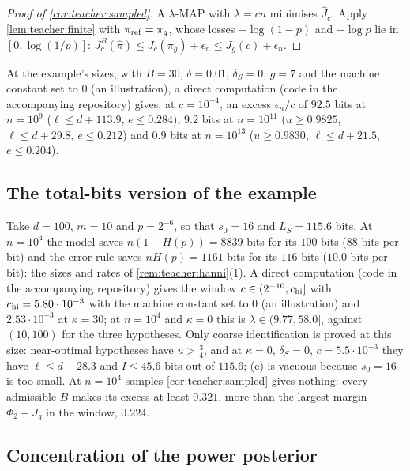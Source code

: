 \begin{proof}[Proof of \cref{cor:teacher:sampled}]
A $\lambda$-MAP with $\lambda=cn$ minimises $\hat J_c$. Apply \cref{lem:teacher:finite} with $\pi_{\rm ref}=\pi_g$, whose losses $-\log(1-p)$ and $-\log p$ lie in $[0,\log(1/p)]$: $J^B_c(\hat\pi)\le J_c(\pi_g)+\epsilon_n\le J_g(c)+\epsilon_n$.
\end{proof}

At the example's sizes, with $B=30$, $\delta=0.01$, $\delta_S=0$, $g=7$ and the machine constant set to $0$ (an illustration), a direct computation (code in the accompanying repository) gives, at $c=10^{-4}$, an excess $\epsilon_n/c$ of $92.5$ bits at $n=10^9$ ($\ell\le d+113.9$, $e\le0.284$), $9.2$ bits at $n=10^{11}$ ($u\ge0.9825$, $\ell\le d+29.8$, $e\le0.212$) and $0.9$ bits at $n=10^{13}$ ($u\ge0.9830$, $\ell\le d+21.5$, $e\le0.204$).

\subsection{The total-bits version of the example}\label{app:teacher:version1}

\begin{example}\label{ex:teacher:version1}
Take $d=100$, $m=10$ and $p=2^{-6}$, so that $s_0=16$ and $L_S=115.6$ bits. At $n=10^4$ the model saves $n(1-H(p))=8839$ bits for its $100$ bits ($88$ bits per bit) and the error rule saves $nH(p)=1161$ bits for its $116$ bits ($10.0$ bits per bit): the sizes and rates of \cref{rem:teacher:hanni}(1). A direct computation (code in the accompanying repository) gives the window $c\in(2^{-10},c_{\rm hi}]$ with $c_{\rm hi}=5.80\cdot10^{-3}$ with the machine constant set to $0$ (an illustration) and $2.53\cdot10^{-3}$ at $\kappa=30$; at $n=10^4$ and $\kappa=0$ this is $\lambda\in(9.77,58.0]$, against $(10,100)$ for the three hypotheses. Only coarse identification is proved at this size: near-optimal hypotheses have $u>\frac34$, and at $\kappa=0$, $\delta_S=0$, $c=5.5\cdot10^{-3}$ they have $\ell\le d+28.3$ and $I\le45.6$ bits out of $115.6$; (e) is vacuous because $s_0=16$ is too small. At $n=10^4$ samples \cref{cor:teacher:sampled} gives nothing: every admissible $B$ makes its excess at least $0.321$, more than the largest margin $\Phi_2-J_g$ in the window, $0.224$.
\end{example}

\subsection{Concentration of the power posterior}\label{app:teacher:concentration}

